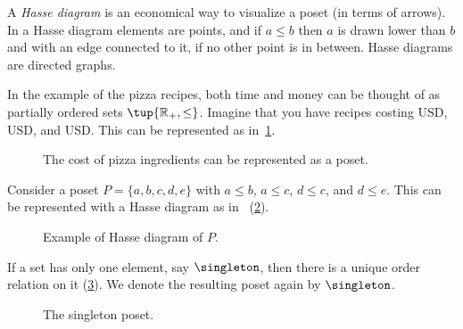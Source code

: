 \noindent A \emph{Hasse diagram} is an economical way to visualize a poset (in terms of arrows). In a Hasse diagram elements are points, and if $a \leq b$ then $a$ is drawn lower than $b$ and with an edge connected to it, if no other point is in between. Hasse diagrams are directed graphs.

In the example of the pizza recipes, both time and money can be thought of as partially ordered sets $\tup{\mathbb{R}_+,\leq}$. Imagine that you have recipes costing \unit[1]{USD}, \unit[2]{USD}, and \unit[3]{USD}. This can be represented as in~\cref{fig:hassepizza}.

\begin{figure}[h!]
    \begin{center}
    \caption{The cost of pizza ingredients can be represented as a poset.\label{fig:hassepizza}}
    \end{center}
\end{figure}


\begin{example}
Consider a poset $P=\{a,b,c,d,e\}$ with $a\leq b$, $a\leq c$, $d\leq c$, and $d\leq e$. This can be represented with a Hasse diagram as in ~(\cref{fig:hasse}).
\end{example}

\begin{figure}[h!]
   \centering
   \caption{Example of Hasse diagram of $P$. \label{fig:hasse}}
\end{figure}


\begin{example}\label{ex:singleton}
If a set has only one element, say $\singleton$, then there is a unique order relation on it (\cref{fig:singleton}). We denote the resulting poset again by $\singleton$.
\end{example}
\begin{figure}[h!]
   \centering
   \caption{The singleton poset.\label{fig:singleton}}
\end{figure}

